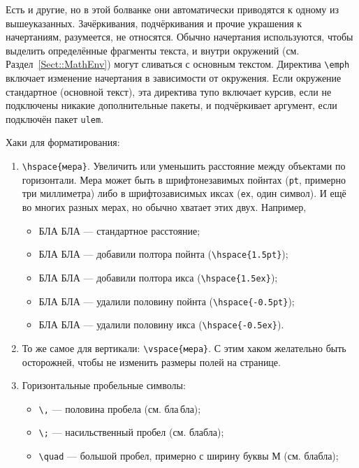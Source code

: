 \documentclass[14pt, russian]{scrartcl}
\begin{document}
Есть и другие, но в этой болванке они автоматически приводятся к одному из вышеуказанных. Зачёркивания, подчёркивания и прочие украшения к начертаниям, разумеется, не относятся. Обычно начертания используются, чтобы выделить определённые фрагменты текста, и внутри окружений (см. Раздел~\ref{Sect::MathEnv}) могут сливаться с основным текстом. Директива \texttt{\textbackslash emph} включает изменение начертания в зависимости от окружения. Если окружение стандартное (основной текст), эта директива тупо включает курсив, если не подключены никакие дополнительные пакеты, и подчёркивает аргумент, если подключён пакет \texttt{ulem}.
 
Хаки для форматирования:
\begin{enumerate}
\item \texttt{\textbackslash hspace\{мера\}}. Увеличить или уменьшить расстояние между объектами по горизонтали. Мера может быть в шрифтонезавимых пойнтах (\texttt{pt}, примерно три миллиметра) либо в шрифтозависимых иксах (\texttt{ex}, один символ). И ещё во многих разных мерах, но обычно хватает этих двух. Например, 
\begin{itemize}
\item БЛА БЛА --- стандартное расстояние; 
\item БЛА\hspace{1.5pt} БЛА --- добавили полтора пойнта (\texttt{\textbackslash hspace\{1.5pt\}});
\item БЛА\hspace{1.5ex} БЛА --- добавили полтора икса (\texttt{\textbackslash hspace\{1.5ex\}});
\item БЛА\hspace{-0.5pt} БЛА --- удалили половину пойнта (\texttt{\textbackslash hspace\{-0.5pt\}});
\item БЛА\hspace{-0.5ex} БЛА --- удалили половину икса (\texttt{\textbackslash hspace\{-0.5ex\}}).
\end{itemize}
\item То же самое для вертикали: \texttt{\textbackslash vspace\{мера\}}. С этим хаком желательно быть осторожней, чтобы не изменить размеры полей на странице.
\item Горизонтальные пробельные символы:
\begin{itemize}
\item \texttt{\textbackslash ,} --- половина пробела (см. бла\,бла);
\item \texttt{\textbackslash ;} --- насильственный пробел (см. бла\;бла);
\item \texttt{\textbackslash quad} --- большой пробел, примерно с ширину буквы М (см. бла\quad бла);

\end{itemize}
\end{enumerate}
\end{document}
